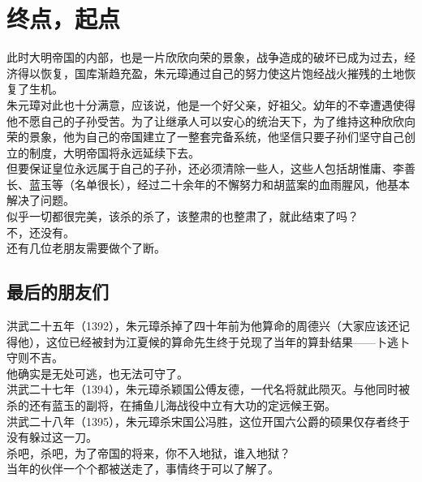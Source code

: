 \section{终点，起点}
\ifnum{}
	\begin{multicols}{\theparacolNo}
\fi
此时大明帝国的内部，也是一片欣欣向荣的景象，战争造成的破坏已成为过去，经济得以恢复，国库渐趋充盈，朱元璋通过自己的努力使这片饱经战火摧残的土地恢复了生机。\\

朱元璋对此也十分满意，应该说，他是一个好父亲，好祖父。幼年的不幸遭遇使得他不愿自己的子孙受苦。为了让继承人可以安心的统治天下，为了维持这种欣欣向荣的景象，他为自己的帝国建立了一整套完备系统，他坚信只要子孙们坚守自己创立的制度，大明帝国将永远延续下去。\\

但要保证皇位永远属于自己的子孙，还必须清除一些人，这些人包括胡惟庸、李善长、蓝玉等（名单很长），经过二十余年的不懈努力和胡蓝案的血雨腥风，他基本解决了问题。\\

似乎一切都很完美，该杀的杀了，该整肃的也整肃了，就此结束了吗？\\

不，还没有。\\

还有几位老朋友需要做个了断。\\

\subsection{最后的朋友们}
洪武二十五年（1392），朱元璋杀掉了四十年前为他算命的周德兴（大家应该还记得他），这位已经被封为江夏候的算命先生终于兑现了当年的算卦结果——卜逃卜守则不吉。\\

他确实是无处可逃，也无法可守了。\\

洪武二十七年（1394），朱元璋杀颖国公傅友德，一代名将就此陨灭。与他同时被杀的还有蓝玉的副将，在捕鱼儿海战役中立有大功的定远候王弼。\\

洪武二十八年（1395），朱元璋杀宋国公冯胜，这位开国六公爵的硕果仅存者终于没有躲过这一刀。\\

杀吧，杀吧，为了帝国的将来，你不入地狱，谁入地狱？\\

当年的伙伴一个个都被送走了，事情终于可以了解了。\\


\end{multicols}
